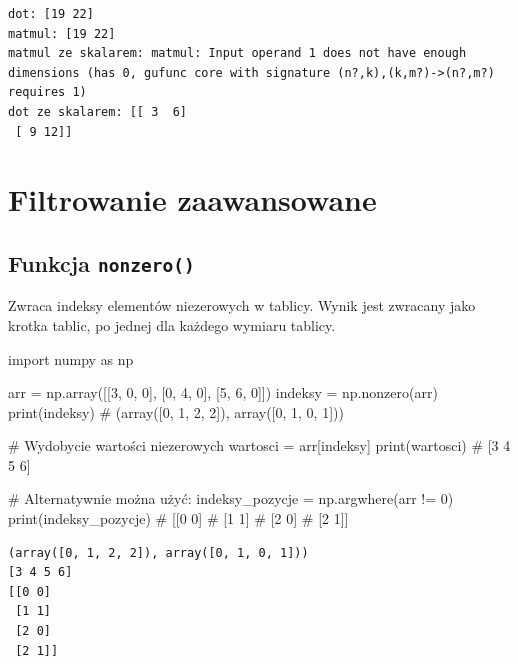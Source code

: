 \documentclass[
  polish,
  letterpaper,
  DIV=11,
  numbers=noendperiod]{scrreprt}
\newenvironment{Shaded}{\begin{snugshade}}{\end{snugshade}}
\newcommand{\BuiltInTok}[1]{\textcolor[rgb]{0.00,0.23,0.31}{#1}}
\newcommand{\CommentTok}[1]{\textcolor[rgb]{0.37,0.37,0.37}{#1}}
\newcommand{\DecValTok}[1]{\textcolor[rgb]{0.68,0.00,0.00}{#1}}
\newcommand{\ImportTok}[1]{\textcolor[rgb]{0.00,0.46,0.62}{#1}}
\newcommand{\NormalTok}[1]{\textcolor[rgb]{0.00,0.23,0.31}{#1}}
\newcommand{\OperatorTok}[1]{\textcolor[rgb]{0.37,0.37,0.37}{#1}}
\begin{document}
\begin{verbatim}
dot: [19 22]
matmul: [19 22]
matmul ze skalarem: matmul: Input operand 1 does not have enough dimensions (has 0, gufunc core with signature (n?,k),(k,m?)->(n?,m?) requires 1)
dot ze skalarem: [[ 3  6]
 [ 9 12]]
\end{verbatim}

\chapter{Filtrowanie zaawansowane}\label{filtrowanie-zaawansowane}

\section{\texorpdfstring{Funkcja
\texttt{nonzero()}}{Funkcja nonzero()}}\label{funkcja-nonzero}

Zwraca indeksy elementów niezerowych w tablicy. Wynik jest zwracany jako
krotka tablic, po jednej dla każdego wymiaru tablicy.

\begin{Shaded}
\begin{Highlighting}[]
\ImportTok{import}\NormalTok{ numpy }\ImportTok{as}\NormalTok{ np}

\NormalTok{arr }\OperatorTok{=}\NormalTok{ np.array([[}\DecValTok{3}\NormalTok{, }\DecValTok{0}\NormalTok{, }\DecValTok{0}\NormalTok{], [}\DecValTok{0}\NormalTok{, }\DecValTok{4}\NormalTok{, }\DecValTok{0}\NormalTok{], [}\DecValTok{5}\NormalTok{, }\DecValTok{6}\NormalTok{, }\DecValTok{0}\NormalTok{]])}
\NormalTok{indeksy }\OperatorTok{=}\NormalTok{ np.nonzero(arr)}
\BuiltInTok{print}\NormalTok{(indeksy)  }\CommentTok{\# (array([0, 1, 2, 2]), array([0, 1, 0, 1]))}

\CommentTok{\# Wydobycie wartości niezerowych}
\NormalTok{wartosci }\OperatorTok{=}\NormalTok{ arr[indeksy]}
\BuiltInTok{print}\NormalTok{(wartosci)  }\CommentTok{\# [3 4 5 6]}

\CommentTok{\# Alternatywnie można użyć:}
\NormalTok{indeksy\_pozycje }\OperatorTok{=}\NormalTok{ np.argwhere(arr }\OperatorTok{!=} \DecValTok{0}\NormalTok{)}
\BuiltInTok{print}\NormalTok{(indeksy\_pozycje)}
\CommentTok{\# [[0 0]}
\CommentTok{\#  [1 1]}
\CommentTok{\#  [2 0]}
\CommentTok{\#  [2 1]]}
\end{Highlighting}
\end{Shaded}

\begin{verbatim}
(array([0, 1, 2, 2]), array([0, 1, 0, 1]))
[3 4 5 6]
[[0 0]
 [1 1]
 [2 0]
 [2 1]]
\end{verbatim}
\end{document}
